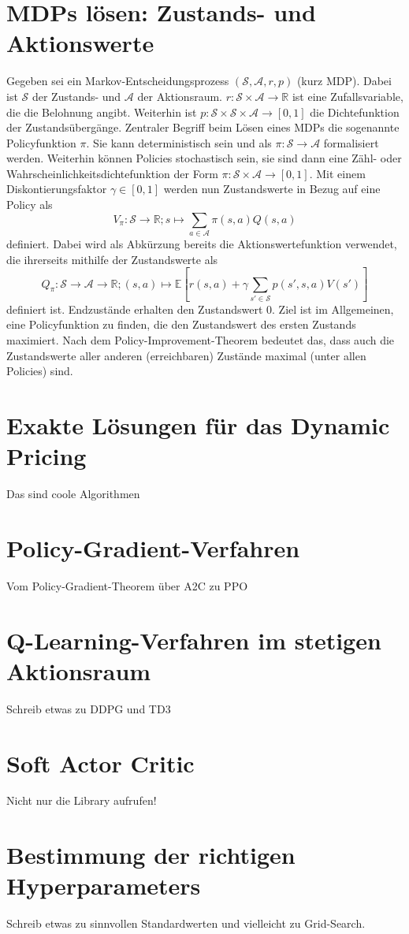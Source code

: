 \section{MDPs lösen: Zustands- und Aktionswerte}
Gegeben sei ein Markov-Entscheidungsprozess $(\mathcal{S}, \mathcal{A}, r, p)$ (kurz MDP).
Dabei ist $\mathcal{S}$ der Zustands- und $\mathcal{A}$ der Aktionsraum.
$r: \mathcal{S} \times \mathcal{A} \rightarrow \mathbb{R}$ ist eine Zufallsvariable, die die Belohnung angibt.
Weiterhin ist $p: \mathcal{S} \times \mathcal{S} \times \mathcal{A} \rightarrow [0,1]$ die Dichtefunktion der Zustandsübergänge.
Zentraler Begriff beim Lösen eines MDPs die sogenannte Policyfunktion $\pi$.
Sie kann deterministisch sein und als $\pi: \mathcal{S} \rightarrow \mathcal{A}$ formalisiert werden.
Weiterhin können Policies stochastisch sein, sie sind dann eine Zähl- oder Wahrscheinlichkeitsdichtefunktion der Form $\pi: \mathcal{S}\times\mathcal{A}\rightarrow [0, 1]$.
Mit einem Diskontierungsfaktor $\gamma \in [0,1]$ werden nun Zustandswerte in Bezug auf eine Policy als
\begin{equation}
    V_\pi: \mathcal{S} \rightarrow \mathbb{R}; s \mapsto \sum_{a\in\mathcal{A}}\pi(s, a) Q(s, a)
\end{equation}
definiert.
Dabei wird als Abkürzung bereits die Aktionswertefunktion verwendet, die ihrerseits mithilfe der Zustandswerte als
\begin{equation}
    Q_\pi: \mathcal{S} \rightarrow \mathcal{A} \rightarrow \mathbb{R}; (s, a) \mapsto \mathbb{E}\left[r(s,a)+\gamma \sum_{s'\in\mathcal{S}}{p(s', s, a) V(s')}\right]
\end{equation}
definiert ist.
Endzustände erhalten den Zustandswert 0.
Ziel ist im Allgemeinen, eine Policyfunktion zu finden, die den Zustandswert des ersten Zustands maximiert.
Nach dem Policy-Improvement-Theorem bedeutet das, dass auch die Zustandswerte aller anderen (erreichbaren) Zustände maximal (unter allen Policies) sind.

\section{Exakte Lösungen für das Dynamic Pricing}
Das sind coole Algorithmen

\section{Policy-Gradient-Verfahren}
Vom Policy-Gradient-Theorem über A2C zu PPO

\section{Q-Learning-Verfahren im stetigen Aktionsraum}
Schreib etwas zu DDPG und TD3

\section{Soft Actor Critic}
Nicht nur die Library aufrufen!

\section{Bestimmung der richtigen Hyperparameters}
Schreib etwas zu sinnvollen Standardwerten und vielleicht zu Grid-Search.
